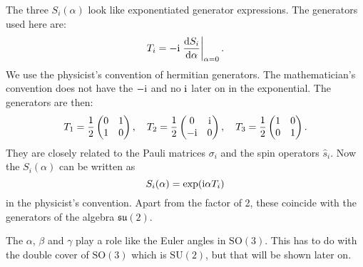 \documentclass[11pt, english, fleqn, DIV=15, headinclude, BCOR=1cm]{scrartcl}
\begin{document}
The three $S_i(\alpha)$ look like exponentiated generator expressions. The
generators used here are:
\[
    T_i = - \mathrm i \left. \frac{\mathop{}\!\mathrm d {S_i}}{\mathop{}\!\mathrm d {\alpha}} \right|_{\alpha = 0}.
\]
We use the physicist's convention of hermitian generators. The mathematician's
convention does not have the $- \mathrm i$ and no $\mathrm i$ later on in the
exponential. The generators are then:
\[
    T_1 = \frac12
    \begin{pmatrix}
        0 & 1 \\ 1 & 0
    \end{pmatrix}
    ,\quad
    T_2 = \frac12
    \begin{pmatrix}
        0 & \mathrm i \\ - \mathrm i & 0
    \end{pmatrix}
    ,\quad
    T_3 = \frac12
    \begin{pmatrix}
        1 & 0 \\ 0 & 1
    \end{pmatrix}.
\]
They are closely related to the Pauli matrices $\sigma_i$ and the spin
operators $\hat s_i$. Now the $S_i(\alpha)$ can be written as
\[
    S_i(\alpha) = \exp(\mathrm i \alpha T_i)
\]
in the physicist's convention. Apart from the factor of 2, these coincide with
the generators of the algebra $\mathfrak{su}(2)$.

The $\alpha$, $\beta$ and $\gamma$ play a role like the Euler angles in
$\mathrm{SO(3)}$. This has to do with the double cover of $\mathrm{SO(3)}$
which is $\mathrm{SU(2)}$, but that will be shown later on.
\end{document}
